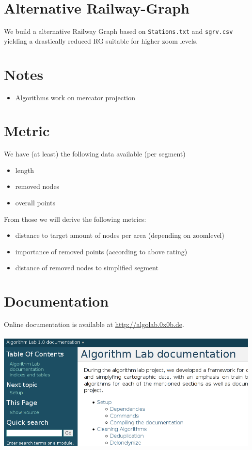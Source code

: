 \documentclass[twoside]{scrartcl}
\begin{document}
\section{Alternative Railway-Graph}
We build a alternative Railway Graph based on \texttt{Stations.txt} and
\texttt{sgrv.csv} yielding a drastically reduced RG suitable for higher zoom
levels.

\section{Notes}
\begin{itemize}
    \item Algorithms work on mercator projection
\end{itemize}

\section{Metric}
We have (at least) the following data available (per segment)

\begin{itemize}
\item length
\item removed nodes
\item overall points
\end{itemize}

From those we will derive the following metrics:

\begin{itemize}
\item distance to target amount of nodes per area (depending on zoomlevel)
\item importance of removed points (according to above rating)
\item distance of removed nodes to simplified segment
\end{itemize}

\section{Documentation}
Online documentation is available at \url{http://algolab.0x0b.de}.\\\\
\includegraphics[scale=0.5]{doc.png}
\end{document}
